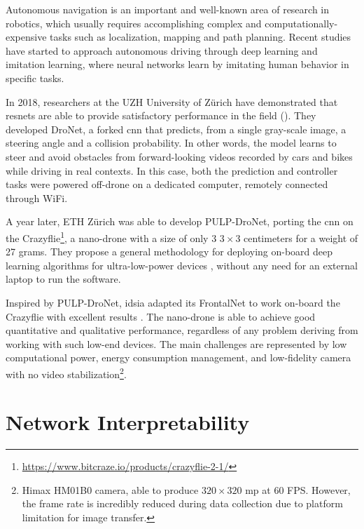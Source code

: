 Autonomous navigation is an important and well-known area of research in robotics, which usually requires accomplishing complex and computationally-expensive tasks such as localization, mapping and path planning. Recent studies have started to approach autonomous driving through deep learning and imitation learning\cite{imitation-learning}, where neural networks learn by imitating human behavior in specific tasks. 

\medskip

In 2018, researchers at the UZH University of Zürich have demonstrated that \gls{resnet}s are able to provide satisfactory performance in the field (\cite{Loquercio_2018}). They developed DroNet, a forked \gls{cnn} that predicts, from a single gray-scale image, a steering angle and a collision probability. In other words, the model learns to steer and avoid obstacles from forward-looking videos recorded by cars and bikes while driving in real contexts. In this case, both the prediction and controller tasks were powered off-drone on a dedicated computer, remotely connected through WiFi. 

A year later, ETH Zürich was able to develop PULP-DroNet, porting the \gls{cnn} on the Crazyflie\footnote{\url{https://www.bitcraze.io/products/crazyflie-2-1/}}, a nano-drone with a size of only 3 $3 \times 3$ centimeters for a weight of 27 grams. They propose a general methodology for deploying on-board deep learning algorithms for ultra-low-power devices \cite{palossi2019pulpdronetIoTJ}, without any need for an external laptop to run the software.

\medskip

Inspired by PULP-DroNet, \gls{idsia} adapted its FrontalNet to work on-board the Crazyflie with excellent results \cite{zimmerman2020thesis}. The nano-drone is able to achieve good quantitative and qualitative performance, regardless of any problem deriving from working with such low-end devices. The main challenges are represented by low computational power, energy consumption management, and low-fidelity camera with no video stabilization\footnote{Himax HM01B0 camera, able to produce $320 \times 320$ \gls{mp} at 60 FPS. However, the frame rate is incredibly reduced during data collection due to platform limitation for image transfer.}.




\section{Network Interpretability}
\label{sec:network-interpretability}

